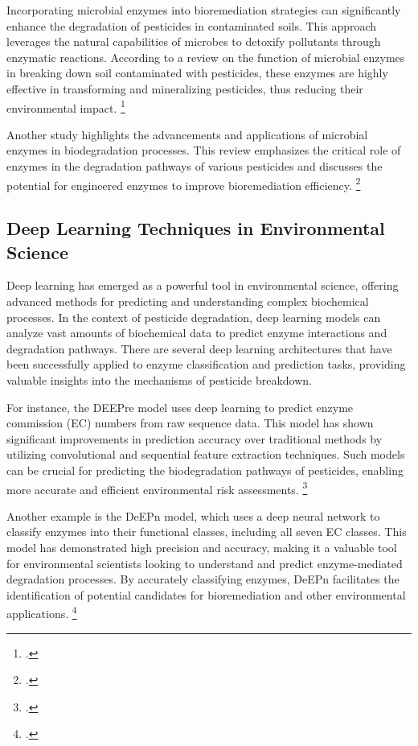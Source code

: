 Incorporating microbial enzymes into bioremediation strategies can significantly enhance the degradation of pesticides in contaminated soils. This approach leverages the natural capabilities of microbes to detoxify pollutants through enzymatic reactions. According to a review on the function of microbial enzymes in breaking down soil contaminated with pesticides, these enzymes are highly effective in transforming and mineralizing pesticides, thus reducing their environmental impact. \footcite{singhMicrobialDegradationOrganophosphorus2006}

Another study highlights the advancements and applications of microbial enzymes in biodegradation processes. This review emphasizes the critical role of enzymes in the degradation pathways of various pesticides and discusses the potential for engineered enzymes to improve bioremediation efficiency. \footcite{chiaFunctionMicrobialEnzymes2024}

\subsection{Deep Learning Techniques in Environmental Science}
\label{sec:Deep Learning Techniques in Environmental Science}

Deep learning has emerged as a powerful tool in environmental science, offering advanced methods for predicting and understanding complex biochemical processes. In the context of pesticide degradation, deep learning models can analyze vast amounts of biochemical data to predict enzyme interactions and degradation pathways. There are several deep learning architectures that have been successfully applied to enzyme classification and prediction tasks, providing valuable insights into the mechanisms of pesticide breakdown.

For instance, the DEEPre model uses deep learning to predict enzyme commission (EC) numbers from raw sequence data. This model has shown significant improvements in prediction accuracy over traditional methods by utilizing convolutional and sequential feature extraction techniques. Such models can be crucial for predicting the biodegradation pathways of pesticides, enabling more accurate and efficient environmental risk assessments. \footcite{liDEEPreSequencebasedEnzyme2017}

Another example is the DeEPn model, which uses a deep neural network to classify enzymes into their functional classes, including all seven EC classes. This model has demonstrated high precision and accuracy, making it a valuable tool for environmental scientists looking to understand and predict enzyme-mediated degradation processes. By accurately classifying enzymes, DeEPn facilitates the identification of potential candidates for bioremediation and other environmental applications. \footcite{DeEPnDeepNeural}

